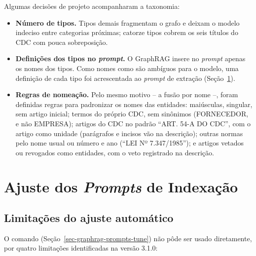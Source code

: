 Algumas decisões de projeto acompanharam a taxonomia:

\begin{itemize}
    \item \textbf{Número de tipos.} Tipos demais fragmentam o grafo e deixam o modelo indeciso entre categorias próximas; catorze tipos cobrem os seis títulos do CDC com pouca sobreposição.
    \item \textbf{Definições dos tipos no \textit{prompt}.} O GraphRAG insere no \textit{prompt} apenas os nomes dos tipos. Como nomes como  são ambíguos para o modelo, uma definição de cada tipo foi acrescentada ao \textit{prompt} de extração (Seção~\ref{sec-indexacao-prompts}).
    \item \textbf{Regras de nomeação.} Pelo mesmo motivo -- a fusão por nome --, foram definidas regras para padronizar os nomes das entidades: maiúsculas, singular, sem artigo inicial; termos do próprio CDC, sem sinônimos (FORNECEDOR, e não EMPRESA); artigos do CDC no padrão ``ART. 54-A DO CDC'', com o artigo como unidade (parágrafos e incisos vão na descrição); outras normas pelo nome usual ou número e ano (``LEI Nº 7.347/1985''); e artigos vetados ou revogados como entidades, com o veto registrado na descrição.
\end{itemize}

\section{Ajuste dos \textit{Prompts} de Indexação}
\label{sec-indexacao-prompts}

\subsection{Limitações do ajuste automático}
\label{sec-indexacao-prompts-limitacoes}

O comando  (Seção~\ref{sec-graphrag-prompts-tune}) não pôde ser usado diretamente, por quatro limitações identificadas na versão 3.1.0:

